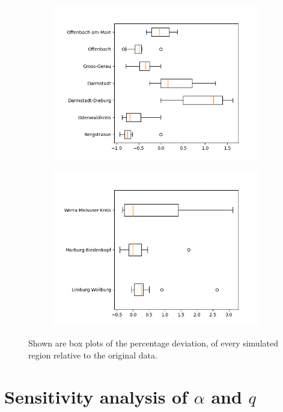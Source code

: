 \begin{figure}
\begin{subfigure}[b]{0.4\textwidth}
		\includegraphics[width=\textwidth]{./figures/50d/deviation_box50_alt3.png}	
	\end{subfigure}
	\begin{subfigure}[b]{0.4\textwidth}
		\centering
		\includegraphics[width=\textwidth]{./figures/50d/deviation_box50_alt4.png}	
	\end{subfigure}
	\caption{Shown are box plots of the percentage deviation, of every simulated region relative to the original data.}
	\label{fig:50_sim_box}
\end{figure}

\section{Sensitivity analysis of $\alpha$ and $q$}

